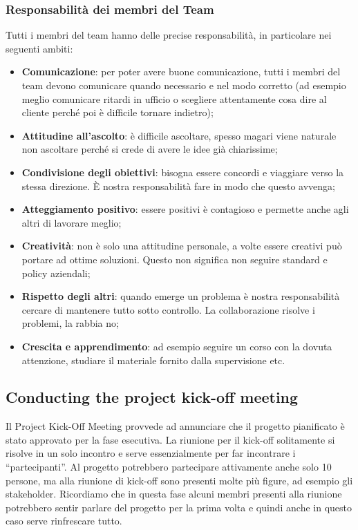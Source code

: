 \subsubsection{Responsabilità dei membri del Team}
Tutti i membri del team hanno delle precise responsabilità, in particolare
nei seguenti ambiti:
\begin{itemize}
	\item \textbf{Comunicazione}: per poter avere buone comunicazione, tutti i membri del team devono comunicare quando necessario e nel modo corretto (ad esempio meglio comunicare ritardi in ufficio o scegliere attentamente cosa dire al cliente perché poi è difficile tornare indietro);
	\item \textbf{Attitudine all’ascolto}: è difficile ascoltare, spesso magari viene naturale non ascoltare perché si crede di avere le idee già chiarissime;
	\item \textbf{Condivisione degli obiettivi}: bisogna essere concordi e viaggiare verso la stessa direzione. È nostra responsabilità fare in modo che questo avvenga;
	\item \textbf{Atteggiamento positivo}: essere positivi è contagioso e permette anche agli altri di lavorare meglio;
	\item \textbf{Creatività}: non è solo una attitudine personale, a volte essere creativi può portare ad ottime soluzioni. Questo non significa non seguire standard e policy aziendali;
	\item \textbf{Rispetto degli altri}: quando emerge un problema è nostra responsabilità cercare di mantenere tutto sotto controllo. La collaborazione risolve i problemi, la rabbia no;
	\item \textbf{Crescita e apprendimento}: ad esempio seguire un corso con la dovuta attenzione, studiare il materiale fornito dalla supervisione etc.
\end{itemize}

\subsection{Conducting the project kick-off meeting}
Il Project Kick-Off Meeting provvede ad annunciare che il progetto pianificato è stato approvato per la fase esecutiva. La riunione per il kick-off solitamente si risolve in un solo incontro e serve essenzialmente per far incontrare i “partecipanti”. Al progetto potrebbero partecipare attivamente anche solo 10 persone, ma alla riunione di kick-off sono presenti molte più figure, ad esempio gli stakeholder. Ricordiamo che in questa fase alcuni membri presenti alla riunione potrebbero sentir parlare del progetto per la prima volta e quindi anche in questo caso serve rinfrescare tutto.
